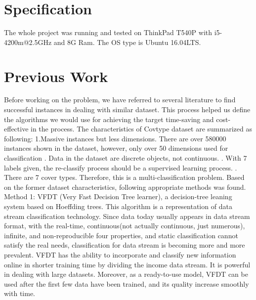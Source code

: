 \documentclass[12pt]{report}
\begin{document}
\section*{Specification}
The whole project was running and tested on ThinkPad T540P with i5-4200m@2.5GHz and 8G Ram. 
\newline
The OS type is Ubuntu 16.04LTS. 

\section*{Previous Work}
Before working on the problem, we have referred to several literature to find successful instances in dealing with similar dataset. This process helped us define the algorithms we would use for achieving the target time-saving and cost-effective in the process.
\newline
\newline
The characteristics of Covtype dataset are summarized as following:
\newline 1.Massive instances but less dimensions.
\newline
There are over 580000 instances shown in the dataset, however, only over 50 dimensions used for classification
. Data in the dataset are discrete objects, not continuous.
. With 7 labels given, the re-classify process should be a supervised learning process.
. There are 7 cover types. Therefore, this is a multi-classification problem.
\newline
\newline
Based on the former dataset characteristics, following appropriate methods was found.
\newline
\newline
Method 1: VFDT (Very Fast Decision Tree learner), a decision-tree leaning system based on Hoeffding trees. 
\newline This algorithm is a representation of data stream classification technology. Since data today usually appears in data stream format, with the real-time, continuous(not actually continuous, just numerous), infinite, and non-reproducible four properties, and static classification cannot satisfy the real needs, classification for data stream is becoming more and more prevalent. 
\newline VFDT has the ability to incorporate and classify new information online in shorter training time by dividing the income data stream. It is powerful in dealing with large datasets. Moreover, as a ready-to-use model, VFDT can be used after the first few data have been trained, and its quality increase smoothly with time.
\end{document}
